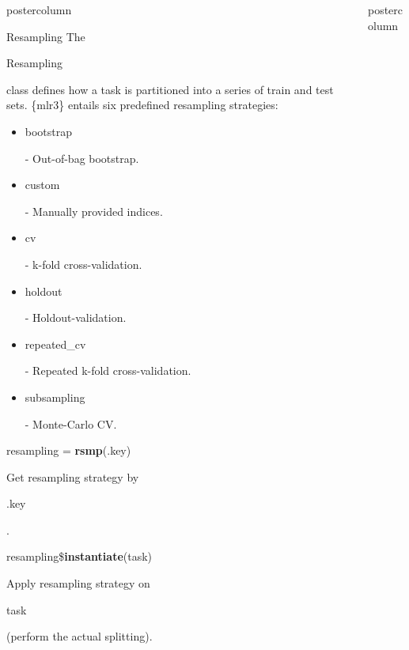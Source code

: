 \documentclass{beamer}
\newlength{\columnheight} %
\newcommand{\codeinline}[1]{\begin{codeboxinline}#1\end{codeboxinline}}
\begin{document}
\begin{withoutheader}
\begin{frame}[fragile]{}
	\begin{columns}
		\begin{column}{.245\textwidth}
			\begin{beamercolorbox}[center]{postercolumn}
				\begin{minipage}{.98\textwidth}
					\parbox[t][\columnheight]{\textwidth}{
							\begin{myblock}{Resampling}
							The \codeinline{Resampling} class defines how a task is
							partitioned into a series of train and test sets. \{mlr3\}
							entails six predefined resampling strategies:
							\\
							\begin{itemize}
								\item \codeinline{bootstrap} - Out-of-bag bootstrap.
								\item \codeinline{custom} - Manually provided indices.
								\item \codeinline{cv} - k-fold cross-validation.
								\item \codeinline{holdout} - Holdout-validation.
								\item \codeinline{repeated\_cv} - Repeated k-fold cross-validation.
								\item \codeinline{subsampling} - Monte-Carlo CV.
							\end{itemize}
							\vspace{1em}
							\begin{codebox}
								resampling = \textbf{rsmp}(.key)
							\end{codebox}
							Get resampling strategy by \codeinline{.key}.
							\\
							\begin{codebox}
								resampling\$\textbf{instantiate}(task)
							\end{codebox}
							Apply resampling strategy on \codeinline{task} (perform
							the actual splitting).
						\end{myblock}
						\vfill
					}
				\end{minipage}
			\end{beamercolorbox}
		\end{column}
		\begin{column}{.245\textwidth}
			\begin{beamercolorbox}[center]{postercolumn}
				\begin{minipage}{.98\textwidth}
					\parbox[t][\columnheight]{\textwidth}{
}
\end{minipage}
\end{beamercolorbox}
\end{column}
\end{columns}
\end{frame}
\end{withoutheader}
\end{document}
